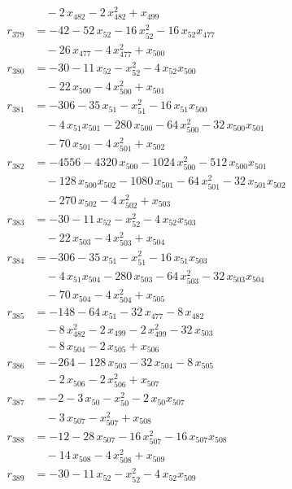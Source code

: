 \begin{align*}
&\quad{}- 2\,x_{482} - 2\,x_{482}^{2} + x_{499} \\
r_{379} &= -42 - 52\,x_{52} - 16\,x_{52}^{2} - 16\,x_{52} x_{477} \\
&\quad{}- 26\,x_{477} - 4\,x_{477}^{2} + x_{500} \\
r_{380} &= -30 - 11\,x_{52} - x_{52}^{2} - 4\,x_{52} x_{500} \\
&\quad{}- 22\,x_{500} - 4\,x_{500}^{2} + x_{501} \\
r_{381} &= -306 - 35\,x_{51} - x_{51}^{2} - 16\,x_{51} x_{500} \\
&\quad{}- 4\,x_{51} x_{501} - 280\,x_{500} - 64\,x_{500}^{2} - 32\,x_{500} x_{501} \\
&\quad{}- 70\,x_{501} - 4\,x_{501}^{2} + x_{502} \\
r_{382} &= -4556 - 4320\,x_{500} - 1024\,x_{500}^{2} - 512\,x_{500} x_{501} \\
&\quad{}- 128\,x_{500} x_{502} - 1080\,x_{501} - 64\,x_{501}^{2} - 32\,x_{501} x_{502} \\
&\quad{}- 270\,x_{502} - 4\,x_{502}^{2} + x_{503} \\
r_{383} &= -30 - 11\,x_{52} - x_{52}^{2} - 4\,x_{52} x_{503} \\
&\quad{}- 22\,x_{503} - 4\,x_{503}^{2} + x_{504} \\
r_{384} &= -306 - 35\,x_{51} - x_{51}^{2} - 16\,x_{51} x_{503} \\
&\quad{}- 4\,x_{51} x_{504} - 280\,x_{503} - 64\,x_{503}^{2} - 32\,x_{503} x_{504} \\
&\quad{}- 70\,x_{504} - 4\,x_{504}^{2} + x_{505} \\
r_{385} &= -148 - 64\,x_{51} - 32\,x_{477} - 8\,x_{482} \\
&\quad{}- 8\,x_{482}^{2} - 2\,x_{499} - 2\,x_{499}^{2} - 32\,x_{503} \\
&\quad{}- 8\,x_{504} - 2\,x_{505} + x_{506} \\
r_{386} &= -264 - 128\,x_{503} - 32\,x_{504} - 8\,x_{505} \\
&\quad{}- 2\,x_{506} - 2\,x_{506}^{2} + x_{507} \\
r_{387} &= -2 - 3\,x_{50} - x_{50}^{2} - 2\,x_{50} x_{507} \\
&\quad{}- 3\,x_{507} - x_{507}^{2} + x_{508} \\
r_{388} &= -12 - 28\,x_{507} - 16\,x_{507}^{2} - 16\,x_{507} x_{508} \\
&\quad{}- 14\,x_{508} - 4\,x_{508}^{2} + x_{509} \\
r_{389} &= -30 - 11\,x_{52} - x_{52}^{2} - 4\,x_{52} x_{509} \\

\end{align*}
